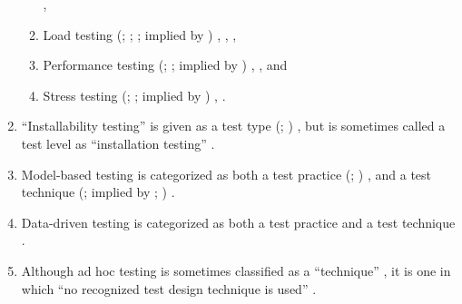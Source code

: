 \begin{enumerate}
\begin{enumerate}
                              \cite[p.~2]{IEEE2013}%
                        \fi,
                  \item Load testing
                        \ifnotpaper
                              (\citealp[pp.~5,~20,~22]{IEEE2022};
                              \citeyear[p.~253]{IEEE2017};
                              \citealpISTQB{}; implied by \citep[p.~54]{Firesmith2015})%
                        \else
                              \cite[p.~253]{IEEE2017},
                              \cite{ISTQB}, \cite[pp.~5,~20,~22]{IEEE2022}%
                        \fi,
                  \item Performance testing
                        \ifnotpaper
                              (\citealp[pp.~7,~22,~26-27]{IEEE2022};
                              \citeyear[p.~7]{IEEE2021}; implied by
                              \citep[p.~53]{Firesmith2015})%
                        \else
                              \cite[pp.~7,~22,~26-27]{IEEE2022}, \cite[p.~7]{IEEE2021}%
                        \fi, and
                  \item Stress testing
                        \ifnotpaper
                              (\citealp[pp.~9,~22]{IEEE2022};
                              \citeyear[p.~442]{IEEE2017}; implied by
                              \citep[p.~54]{Firesmith2015})%
                        \else
                              \cite[p.~442]{IEEE2017}, \cite[pp.~9,~22]{IEEE2022}%
                        \fi.
            \end{enumerate}
      \item ``Installability testing'' is given as a test type
            \ifnotpaper
                  (\citealp[p.~22]{IEEE2022}; \citeyear[p.~38]{IEEE2021})
            \else
                  \cite[p.~22]{IEEE2022}, \cite[p.~38]{IEEE2021}
            \fi but is sometimes called a test level as
            ``installation testing'' \citep[p.~445]{PetersAndPedrycz2000}.
      \item Model-based testing is categorized as both a test practice
            \ifnotpaper
                  (\citealp[p.~22]{IEEE2022}; \citeyear[p.~viii]{IEEE2021})
            \else
                  \cite[p.~22]{IEEE2022}, \cite[p.~viii]{IEEE2021}
            \fi and a test technique
            \ifnotpaper
                  (\citealp[p.~4]{Kam2008}; implied by
                  \citealp[p.~7]{IEEE2021}; \citeyear[p.~469]{IEEE2017})%
            \else
                  \cite[p.~4]{Kam2008}%
            \fi.
      \item Data-driven testing is categorized as both a test practice
            \citep[p.~22]{IEEE2022} and a test technique
            \citep[p.~43]{Kam2008}.
      \item Although ad hoc testing is sometimes classified as a ``technique''
            \citep[p.~5-14]{SWEBOK2024}, it is one in which ``no recognized test
            design technique is used'' \citep[p.~42]{Kam2008}.
\end{enumerate}

